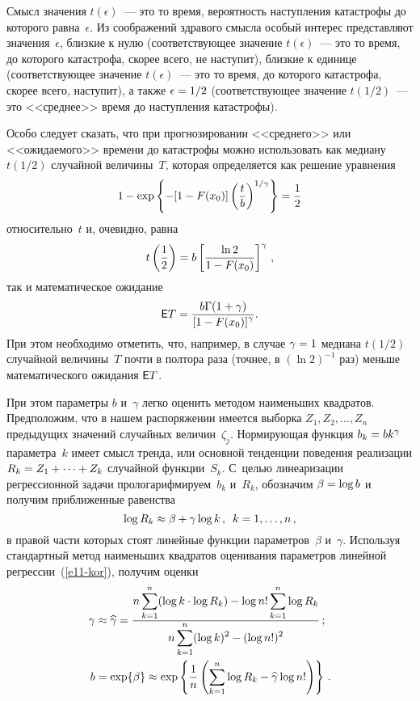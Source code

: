 \begin{multicols}{2}
Смысл значения $t(\epsilon)$~--- это то время, вероятность
наступления катастрофы до которого равна~$\epsilon$. Из соображений
здравого смысла особый интерес представляют значения~$\epsilon$,
близкие к нулю (соответствующее значение $t(\epsilon)$~--- это то
время, до которого катастрофа, скорее всего, не наступит), близкие к
единице (соответствующее значение $t(\epsilon)$~--- это то время, до
которого катастрофа, скорее всего, наступит), а также
$\epsilon\hm=1/2$ (соответствующее значение $t(1/2)$~--- это
<<среднее>> время до наступления катастрофы).

Особо следует сказать, что при прогнозировании <<среднего>> или
<<ожидаемого>> времени до катастрофы можно использовать как медиану
$t(1/2)$ случайной величины~$T$, которая определяется как
решение уравнения
$$
1-\exp\left\{-[1-F(x_0)]\left(\displaystyle\frac{\displaystyle t\mathstrut}{\displaystyle b\mathstrut}\right)^{1/\gamma}\right\}=\displaystyle\frac{\displaystyle 1\mathstrut}{\displaystyle 2\mathstrut}
$$
относительно~$t$ и, очевидно, равна
$$
t\left(\displaystyle\frac{\displaystyle 1\mathstrut}{\displaystyle 2\mathstrut}\right)=b\left[\displaystyle\frac{\displaystyle \ln 2\mathstrut}{\displaystyle 1-F(x_0)\mathstrut}\right]^{\gamma}\,,
$$
так и математическое ожидание
$$
{\sf E}T=\displaystyle\frac{\displaystyle b\Gamma(1+\gamma)\mathstrut}{\displaystyle [1-F(x_0)]^{\gamma}\mathstrut}.
$$
При этом необходимо отметить, что, например, в случае $\gamma\hm=1$
медиана $t(1/2)$ случайной величины~$T$ почти в полтора раза
(точнее, в $(\ln 2)^{-1}$ раз) меньше математического ожидания ${\sf E}T$.

При этом параметры $b$ и~$\gamma$ легко оценить методом наименьших
квадратов. Предположим, что в нашем распоряжении имеется выборка
$Z_1,Z_2,\ldots,Z_n$ предыду\-щих значений случайных величин~$\zeta_j$. 
Нормирующая функция $b_k\hm=bk^{\gamma}$ параметра~$k$ имеет
смысл тренда, или основной тенденции поведения реализации
$R_k\hm=Z_1+\cdots+Z_k$ случайной функции~$S_k$. С~целью линеаризации
регрессионной задачи прологарифмируем~$b_k$ и~$R_k$, обозначим
$\beta\hm=\log b$ и получим приближенные равенства
\begin{equation}
\log R_k\approx\beta+\gamma\log k\,,\enskip k=1,\ldots,n\,,\label{e11-kor}
\end{equation}
в правой части которых стоят линейные функции параметров~$\beta$ и~$\gamma$. 
Используя стандартный метод наименьших квадратов
оценивания параметров линейной регрессии~(\ref{e11-kor}), получим оценки
\begin{align*}
\gamma&\approx\widehat\gamma=\displaystyle\frac{\displaystyle n\sum\limits_{k=1}^n(\log k\cdot\log
R_k)-\log n!\sum\limits_{k=1}^n\log R_k\mathstrut}{\displaystyle n\sum\limits_{k=1}^n(\log k)^2-(\log n!)^2\mathstrut}\,;
\\
b&=\exp\{\beta\}\approx\exp\left\{\displaystyle\frac{\displaystyle 1\mathstrut}{\displaystyle n\mathstrut}\left(\sum\limits_{k=1}^n\log
R_k-\widehat\gamma\log n!\right)\right\}\,.
\end{align*}


\end{multicols}
